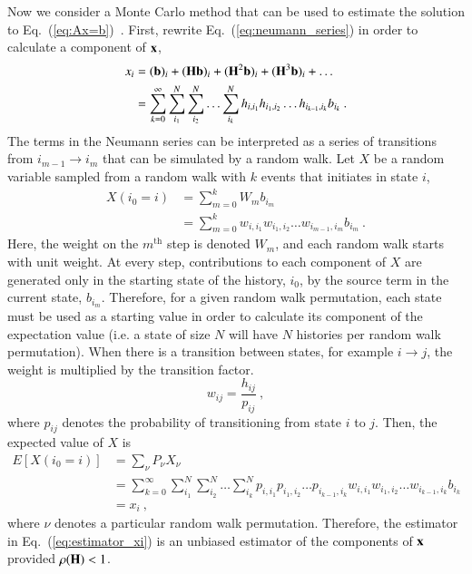 \documentclass[preprint,12pt]{elsarticle}
\newcommand{\vb}{\ensuremath{\ve{b}}}
\newcommand{\vx}{\ensuremath{\ve{x}}}
\newcommand{\vH}{\ensuremath{\ve{H}}}
\begin{document}
Now we consider a Monte Carlo method that can be used to estimate the
solution to Eq.~(\ref{eq:Ax=b})~\cite{hammersley_1964}.  First,
rewrite Eq.~(\ref{eq:neumann_series}) in order to calculate a
component of $\vx$,
\begin{equation}
  \begin{split}
    x_i &= (\vb)_i + (\vH\vb)_i + (\vH^2\vb)_i + (\vH^3\vb)_i +
    \ldots\\ &= \sum_{k=0}^{\infty}\sum_{i_1}^{N}\sum_{i_2}^{N}\ldots
    \sum_{i_k}^{N}h_{i,i_1}h_{i_1,i_2}\ldots h_{i_{k-1},i_k}b_{i_k}\:.
  \end{split}
  \label{eq:neumann_series_i}
\end{equation}
The terms in the Neumann series can be interpreted as a series of
transitions from $i_{m-1}\rightarrow i_m$ that can be simulated by a
random walk.  Let $X$ be a random variable sampled from a random walk
with $k$ events that initiates in state $i$,
\begin{equation}
  \begin{split}
    X(i_0 = i) &= \sum_{m=0}^{k}W_m b_{i_m}\\ &=
    \sum_{m=0}^{k}w_{i,i_1}w_{i_1,i_2}\ldots w_{i_{m-1},i_m}b_{i_m}\:.
  \end{split}
  \label{eq:estimator_xi}
\end{equation}
Here, the weight on the $m^\text{th}$ step is denoted $W_m$, and each
random walk starts with unit weight. At every step, contributions to
each component of $X$ are generated only in the starting state of the
history, $i_0$, by the source term in the current state,
$b_{i_m}$. Therefore, for a given random walk permutation, each state
must be used as a starting value in order to calculate its component
of the expectation value (i.e. a state of size $N$ will have $N$
histories per random walk permutation). When there is a transition
between states, for example $i\rightarrow j$, the weight is multiplied
by the transition factor.
\begin{equation}
  w_{ij} = \frac{h_{ij}}{p_{ij}}\:,
  \label{eq:weight}
\end{equation}
where $p_{ij}$ denotes the probability of transitioning from state $i$
to $j$. Then, the expected value of $X$ is
\begin{equation}
  \begin{split}
    E[X(i_0=i)] &= \sum_{\nu}P_\nu X_\nu\\ &=
    \sum_{k=0}^{\infty}\sum_{i_1}^{N}\sum_{i_2}^{N}\ldots
    \sum_{i_k}^{N}p_{i,i_1}p_{i_1,i_2}\ldots p_{i_{k-1},i_k}
    w_{i,i_1}w_{i_1,i_2}\dots w_{i_{k-1},i_k}b_{i_k}\\ &= x_i\:,
  \end{split}
  \label{eq:expectation_xi}
\end{equation}
where $\nu$ denotes a particular random walk permutation.  Therefore,
the estimator in Eq.~(\ref{eq:estimator_xi}) is an unbiased estimator
of the components of $\vx$ provided $\rho(\vH) < 1$.
\end{document}
